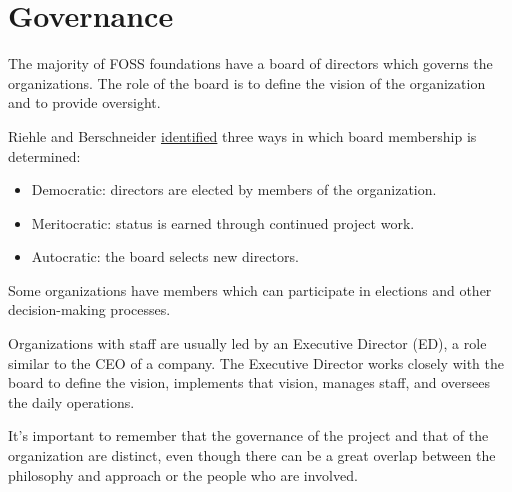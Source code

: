 


\chapter{Governance}

The majority of FOSS foundations have a board of directors which governs the organizations.  The role of the board is to define the vision of the organization and to provide oversight.

Riehle and Berschneider \href{https://doi.org/10.1007/978-3-642-33442-9_2}{identified} three ways in which board membership is determined:

\begin{itemize}

\item Democratic: directors are elected by members of the organization.

\item Meritocratic: status is earned through continued project work.

\item Autocratic: the board selects new directors.

\end{itemize}

Some organizations have members which can participate in elections and other decision-making processes.

Organizations with staff are usually led by an Executive Director (ED), a role similar to the CEO of a company.  The Executive Director works closely with the board to define the vision, implements that vision, manages staff, and oversees the daily operations.

It's important to remember that the governance of the project and that of the organization are distinct, even though there can be a great overlap between the philosophy and approach or the people who are involved.

